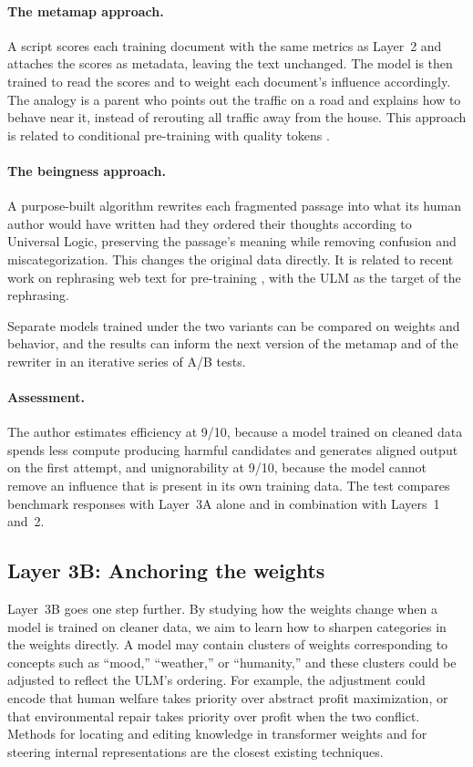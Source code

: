 \documentclass[twocolumn]{ulpaper}
\begin{document}
\paragraph{The metamap approach.} A script scores each training document with the same metrics as Layer~2 and attaches the scores as metadata, leaving the text unchanged. The model is then trained to read the scores and to weight each document's influence accordingly. The analogy is a parent who points out the traffic on a road and explains how to behave near it, instead of rerouting all traffic away from the house. This approach is related to conditional pre-training with quality tokens \citep{korbak2023pretraining}.

\paragraph{The beingness approach.} A purpose-built algorithm rewrites each fragmented passage into what its human author would have written had they ordered their thoughts according to Universal Logic, preserving the passage's meaning while removing confusion and miscategorization. This changes the original data directly. It is related to recent work on rephrasing web text for pre-training \citep{maini2024rephrasing}, with the ULM as the target of the rephrasing.

Separate models trained under the two variants can be compared on weights and behavior, and the results can inform the next version of the metamap and of the rewriter in an iterative series of A/B tests.

\paragraph{Assessment.} The author estimates efficiency at 9/10, because a model trained on cleaned data spends less compute producing harmful candidates and generates aligned output on the first attempt, and unignorability at 9/10, because the model cannot remove an influence that is present in its own training data. The test compares benchmark responses with Layer~3A alone and in combination with Layers~1 and~2.

\subsection{Layer 3B: Anchoring the weights}

Layer~3B goes one step further. By studying how the weights change when a model is trained on cleaner data, we aim to learn how to sharpen categories in the weights directly. A model may contain clusters of weights corresponding to concepts such as ``mood,'' ``weather,'' or ``humanity,'' and these clusters could be adjusted to reflect the ULM's ordering. For example, the adjustment could encode that human welfare takes priority over abstract profit maximization, or that environmental repair takes priority over profit when the two conflict. Methods for locating and editing knowledge in transformer weights \citep{meng2022locating} and for steering internal representations \citep{zou2023representation} are the closest existing techniques.
\end{document}
